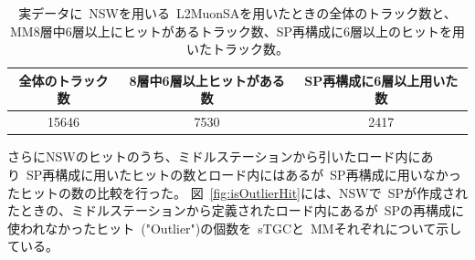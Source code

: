 \begin{table}[H]
    \centering
    \begin{tabular}{|c|c|c|}\hline
         全体のトラック数 & 8層中6層以上ヒットがある数 & SP再構成に6層以上用いた数  \\ \hline
         15646 & 7530 & 2417 \\ \hline
    \end{tabular}
    \caption{実データに~NSWを用いる~L2MuonSAを用いたときの全体のトラック数と、MM8層中6層以上にヒットがあるトラック数、SP再構成に6層以上のヒットを用いたトラック数。}
    \label{tab:numOfMMhits}
\end{table}


さらにNSWのヒットのうち、ミドルステーションから引いたロード内にあり~SP再構成に用いたヒットの数とロード内にはあるが~SP再構成に用いなかったヒットの数の比較を行った。
図~\ref{fig:isOutlierHit}には、NSWで~SPが作成されたときの、ミドルステーションから定義されたロード内にあるが~SPの再構成に使われなかったヒット~("Outlier")の個数を~sTGCと~MMそれぞれについて示している。

